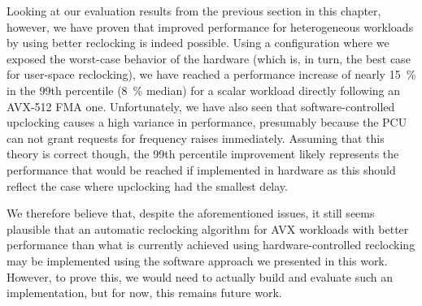 Looking at our evaluation results from the previous section in this chapter, however, we have proven that improved performance for heterogeneous workloads by using better reclocking is indeed possible. Using a configuration where we exposed the worst-case behavior of the hardware (which is, in turn, the best case for user-space reclocking), we have reached a performance increase of nearly \SI{15}{\percent} in the 99th percentile (\SI{8}{\percent} median) for a scalar workload directly following an \gls{AVX-512} \gls{FMA} one. Unfortunately, we have also seen that software-controlled upclocking causes a high variance in performance, presumably because the \gls{PCU} can not grant requests for frequency raises immediately. Assuming that this theory is correct though, the 99th percentile improvement likely represents the performance that would be reached if implemented in hardware as this should reflect the case where upclocking had the smallest delay.

We therefore believe that, despite the aforementioned issues, it still seems plausible that an automatic reclocking algorithm for \gls{AVX} workloads with better performance than what is currently achieved using hardware-controlled reclocking may be implemented using the software approach we presented in this work. However, to prove this, we would need to actually build and evaluate such an implementation, but for now, this remains future work.